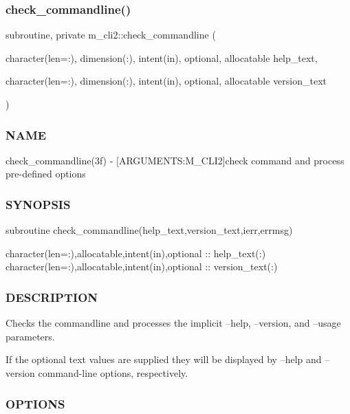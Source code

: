 \subsubsection{\texorpdfstring{check\+\_\+commandline()}{check\_commandline()}}
{\footnotesize\ttfamily subroutine, private m\+\_\+cli2\+::check\+\_\+commandline (\begin{DoxyParamCaption}\item[{character(len=\+:), dimension(\+:), intent(in), optional, allocatable}]{help\+\_\+text,  }\item[{character(len=\+:), dimension(\+:), intent(in), optional, allocatable}]{version\+\_\+text }\end{DoxyParamCaption})\hspace{0.3cm}{\ttfamily [private]}}



\subsubsection*{N\+A\+ME}

check\+\_\+commandline(3f) -\/ \mbox{[}A\+R\+G\+U\+M\+E\+N\+TS\+:M\+\_\+\+C\+L\+I2\mbox{]}check command and process pre-\/defined options 

\subsubsection*{S\+Y\+N\+O\+P\+S\+IS}

\begin{DoxyVerb}  subroutine check_commandline(help_text,version_text,ierr,errmsg)

   character(len=:),allocatable,intent(in),optional :: help_text(:)
   character(len=:),allocatable,intent(in),optional :: version_text(:)
\end{DoxyVerb}


\subsubsection*{D\+E\+S\+C\+R\+I\+P\+T\+I\+ON}

Checks the commandline and processes the implicit --help, --version, and --usage parameters.

If the optional text values are supplied they will be displayed by --help and --version command-\/line options, respectively.

\subsubsection*{O\+P\+T\+I\+O\+NS}

